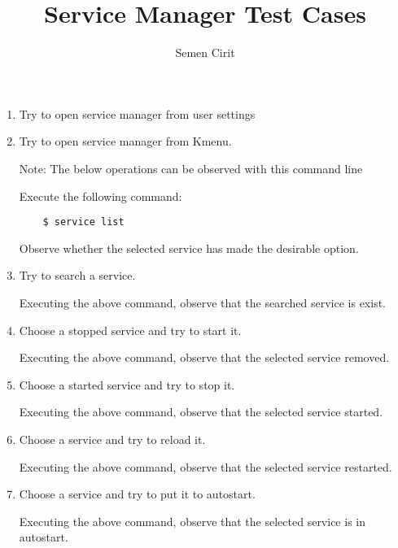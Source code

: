 \documentclass[a4paper,10pt]{article}
\title{Service Manager Test Cases}
\author{Semen Cirit}
\begin{document}
\maketitle
\begin{enumerate}
\item Try to open service manager from user settings

\item Try to open service manager from Kmenu.

Note: The below operations can be observed with this command line 

Execute the following command:
\begin{verbatim}
    $ service list
\end{verbatim}

Observe whether the selected service has made the desirable option.

\item Try to search a service.

Executing the above command, observe that the searched service is exist.

\item Choose a stopped service and try to start it.

Executing the above command, observe that the selected service removed.

\item Choose a started service and try to stop  it.

Executing the above command, observe that the selected service started.

\item Choose a service and try to reload it.

Executing the above command, observe that the selected service restarted.

\item Choose a service and try to put it to autostart.

Executing the above command, observe that the selected service is in autostart.

\end{enumerate}
\end{document}
